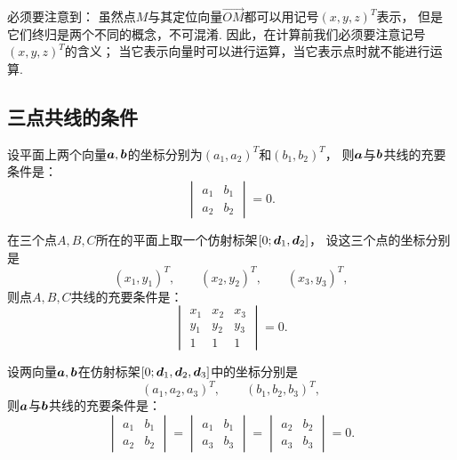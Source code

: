 必须要注意到：
虽然点\(M\)与其定位向量\(\vec{OM}\)都可以用记号\((x,y,z)^T\)表示，%
但是它们终归是两个不同的概念，不可混淆.
因此，在计算前我们必须要注意记号\((x,y,z)^T\)的含义；
当它表示向量时可以进行运算，当它表示点时就不能进行运算.

\subsection{三点共线的条件}
\begin{theorem}\label{theorem:解析几何.平面上两向量共线的充要条件}
设平面上两个向量\(\boldsymbol{a},\boldsymbol{b}\)的坐标分别为\((a_1,a_2)^T\)和\((b_1,b_2)^T\)，
则\(\boldsymbol{a}\)与\(\boldsymbol{b}\)共线的充要条件是：\[
\begin{vmatrix}
	a_1 & b_1 \\
	a_2 & b_2
\end{vmatrix} = 0.
\]
\end{theorem}

\begin{theorem}\label{theorem:解析几何.平面上三点共线的充要条件}
在三个点\(A,B,C\)所在的平面上取一个仿射标架\([0;\boldsymbol{d}_1,\boldsymbol{d}_2]\)，
设这三个点的坐标分别是\[
	(x_1,y_1)^T, \qquad
	(x_2,y_2)^T, \qquad
	(x_3,y_3)^T,
\]
则点\(A,B,C\)共线的充要条件是：\[
\begin{vmatrix}
	x_1 & x_2 & x_3 \\
	y_1 & y_2 & y_3 \\
	1 & 1 & 1
\end{vmatrix} = 0.
\]
\end{theorem}

\begin{theorem}\label{theorem:解析几何.两向量共线的充要条件2}
设两向量\(\boldsymbol{a},\boldsymbol{b}\)在仿射标架\([0;\boldsymbol{d}_1,\boldsymbol{d}_2,\boldsymbol{d}_3]\)中的坐标分别是\[
	(a_1,a_2,a_3)^T, \qquad
	(b_1,b_2,b_3)^T,
\]
则\(\boldsymbol{a}\)与\(\boldsymbol{b}\)共线的充要条件是：\[
\begin{vmatrix}
	a_1 & b_1 \\
	a_2 & b_2
\end{vmatrix}
= \begin{vmatrix}
	a_1 & b_1 \\
	a_3 & b_3
\end{vmatrix}
= \begin{vmatrix}
	a_2 & b_2 \\
	a_3 & b_3
\end{vmatrix} = 0.
\]
\end{theorem}

